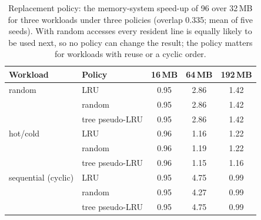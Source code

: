 \begin{table}[htbp]
  \centering
  \caption[Replacement policy and the gain from a larger L3]{Replacement policy: the memory-system speed-up of 96 over 32\,MB for three workloads under three policies (overlap 0.335; mean of five seeds). With random accesses every resident line is equally likely to be used next, so no policy can change the result; the policy matters for workloads with reuse or a cyclic order.}
  \label{tab:sim-policy}
  \small
  \begin{tabular}{@{}llccc@{}}
    \toprule
    \textbf{Workload} & \textbf{Policy} & \textbf{16\,MB} & \textbf{64\,MB} & \textbf{192\,MB} \\
    \midrule
    random & LRU & 0.95 & 2.86 & 1.42 \\
     & random & 0.95 & 2.86 & 1.42 \\
     & tree pseudo-LRU & 0.95 & 2.86 & 1.42 \\
    hot/cold & LRU & 0.96 & 1.16 & 1.22 \\
     & random & 0.96 & 1.19 & 1.22 \\
     & tree pseudo-LRU & 0.96 & 1.15 & 1.16 \\
    sequential (cyclic) & LRU & 0.95 & 4.75 & 0.99 \\
     & random & 0.95 & 4.27 & 0.99 \\
     & tree pseudo-LRU & 0.95 & 4.75 & 0.99 \\
    \bottomrule
  \end{tabular}
\end{table}
